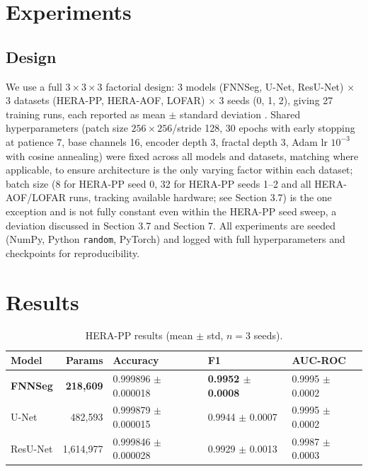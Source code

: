 \documentclass[11pt]{article}
\begin{document}
\section{Experiments}

\subsection{Design}

We use a full $3\times3\times3$ factorial design: 3 models (FNNSeg, U-Net, ResU-Net) $\times$ 3 datasets (HERA-PP, HERA-AOF, LOFAR) $\times$ 3 seeds (0, 1, 2), giving 27 training runs, each reported as mean $\pm$ standard deviation \citep{bouthillier2021}. Shared hyperparameters (patch size $256\times256$/stride 128, 30 epochs with early stopping at patience 7, base channels 16, encoder depth 3, fractal depth 3, Adam lr $10^{-3}$ with cosine annealing) were fixed across all models and datasets, matching \citet{dutoit2023} where applicable, to ensure architecture is the only varying factor within each dataset; batch size (8 for HERA-PP seed 0, 32 for HERA-PP seeds 1--2 and all HERA-AOF/LOFAR runs, tracking available hardware; see Section 3.7) is the one exception and is not fully constant even within the HERA-PP seed sweep, a deviation discussed in Section 3.7 and Section 7. All experiments are seeded (NumPy, Python \texttt{random}, PyTorch) and logged with full hyperparameters and checkpoints for reproducibility.

\section{Results}

\begin{table}[h]
\centering
\caption{HERA-PP results (mean $\pm$ std, $n=3$ seeds).}
\begin{tabular}{lrlll}
\toprule
Model & Params & Accuracy & F1 & AUC-ROC \\
\midrule
\textbf{FNNSeg} & \textbf{218,609} & 0.999896 $\pm$ 0.000018 & \textbf{0.9952 $\pm$ 0.0008} & 0.9995 $\pm$ 0.0002 \\
U-Net & 482,593 & 0.999879 $\pm$ 0.000015 & 0.9944 $\pm$ 0.0007 & 0.9995 $\pm$ 0.0002 \\
ResU-Net & 1,614,977 & 0.999846 $\pm$ 0.000028 & 0.9929 $\pm$ 0.0013 & 0.9987 $\pm$ 0.0003 \\
\bottomrule
\end{tabular}
\end{table}
\end{document}

